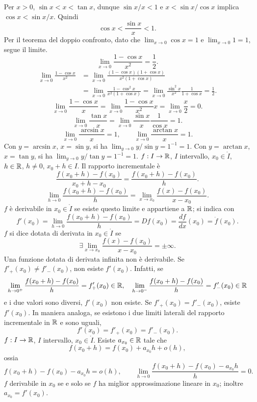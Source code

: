 Per $x>0$, $\sin x<x<\tan x$, dunque $\sin x/x<1$ e $x<\sin x/\cos x$ implica $\cos x<\sin x/x$.
Quindi
\[\cos x<\frac{\sin x}x<1.\]
Per il teorema del doppio confronto, dato che $\lim_{x\to0}\cos x=1$ e $\lim_{x\to0}1=1$, segue il limite.
\[\lim_{x\to0}\frac{1-\cos x}{x^2}=\frac12.\]
\begin{align*}
\lim_{x\to0}\frac{1-\cos x}{x^2}
&=\lim_{x\to0}\frac{(1-\cos x)(1+\cos x)}{x^2(1+\cos x)}\\
&=\lim_{x\to0}\frac{1-\cos^2x}{x^2(1+\cos x)}
=\lim_{x\to0}\frac{\sin^2x}{x^2}\frac1{1+\cos x}=\frac12.
\end{align*}
\[\lim_{x\to0}\frac{1-\cos x}x=\lim_{x\to0}\frac{1-\cos x}{x^2}x=\lim_{x\to0}\frac x2=0.\]
\[\lim_{x\to0}\frac{\tan x}x=\lim_{x\to0}\frac{\sin x}x\frac1{\cos x}=1.\]
\[\lim_{x\to0}\frac{\arcsin x}x=1,\qquad\lim_{x\to0}\frac{\arctan x}x=1.\]
Con $y=\arcsin x$, $x=\sin y$, si ha $\lim_{y\to0}y/\sin y=1^{-1}=1$.
Con $y=\arctan x$, $x=\tan y$, si ha $\lim_{y\to0}y/\tan y=1^{-1}=1$.
$f:I\to\mathbb R$, $I$ intervallo, $x_0\in\mathring I$, $h\in\mathbb R$, $h\ne0$, $x_0+h\in I$.
Il rapporto incrementale è
\[\frac{f(x_0+h)-f(x_0)}{x_0+h-x_0}=\frac{f(x_0+h)-f(x_0)}h.\]
\[\lim_{h\to0}\frac{f(x_0+h)-f(x_0)}h=\lim_{x\to x_0}\frac{f(x)-f(x_0)}{x-x_0}.\]
$f$ è derivabile in $x_0\in\mathring I$ se esiste questo limite e appartiene a $\mathbb R$; si indica con
\[f'(x_0)=\lim_{h\to0}\frac{f(x_0+h)-f(x_0)}h=Df(x_0)=\frac{df}{dx}(x_0)=\dot f(x_0).\]
$f$ si dice dotata di derivata in $x_0\in\mathring I$ se
\[\exists\lim_{x\to x_0}\frac{f(x)-f(x_0)}{x-x_0}=\pm\infty.\]
Una funzione dotata di derivata infinita non è derivabile.
Se $f'_+(x_0)\ne f'_-(x_0)$, non esiste $f'(x_0)$.
Infatti, se
\[\lim_{h\to0^+}\frac{f(x_0+h)-f(x_0)}h=f'_+(x_0)\in\mathbb R,\quad
\lim_{h\to0^-}\frac{f(x_0+h)-f(x_0)}h=f'_-(x_0)\in\mathbb R\]
e i due valori sono diversi, $f'(x_0)$ non esiste.
Se $f'_+(x_0)=f'_-(x_0)$, esiste $f'(x_0)$.
In maniera analoga, se esistono i due limiti laterali del rapporto incrementale in $\mathbb R$ e sono uguali,
\[f'(x_0)=f'_+(x_0)=f'_-(x_0).\]
$f:I\to\mathbb R$, $I$ intervallo, $x_0\in\mathring I$. Esiste $a_{x_0}\in\mathbb R$ tale che
\[f(x_0+h)=f(x_0)+a_{x_0}h+o(h),\]
ossia
\[f(x_0+h)-f(x_0)-a_{x_0}h=o(h),\qquad
\lim_{h\to0}\frac{f(x_0+h)-f(x_0)-a_{x_0}h}h=0.\]
$f$ derivabile in $x_0$ se e solo se $f$ ha miglior approssimazione lineare in $x_0$; inoltre $a_{x_0}=f'(x_0)$.
